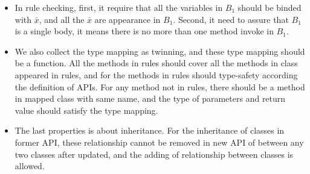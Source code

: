  \begin{itemize}
     \item In rule checking, first, it require that all the variables in
 $B_{1}$ should be binded with $\bar{x}$, and all the $\bar{x}$ are appearance in $B_{1}$. Second, it 
 need to assure that $B_{1}$ is a single body, 
 it means there is no more than one method invoke in $B_{1}$.

    \item We also collect the type mapping as twinning, and these type mapping should be a 
        function. All the methods in rules should cover all the methods in class appeared in rules, and
        for the methods in rules should type-safety according the definition of APIs. For any method
        not in rules, there should be a method in mapped class with same name, and the type of
        parameters and return value should satisfy the type mapping.

    \item The last properties is about inheritance. For the inheritance of classes in former API, 
        these relationship cannot be removed in new API of between any two classes after updated, and
        the adding of relationship between classes is allowed.
\end{itemize}
